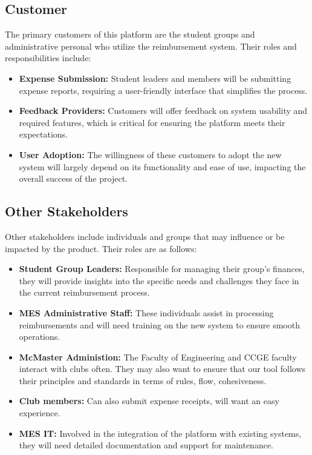 \documentclass[12pt]{article}
\begin{document}
\subsection{Customer}
The primary customers of this platform are the student groups and administrative personal who utilize the reimbursement system. Their roles and responsibilities include:
\begin{itemize}
    \item \textbf{Expense Submission:} Student leaders and members will be submitting expense reports, requiring a user-friendly interface that simplifies the process.
    \item \textbf{Feedback Providers:} Customers will offer feedback on system usability and required features, which is critical for ensuring the platform meets their expectations.
    \item \textbf{User Adoption:} The willingness of these customers to adopt the new system will largely depend on its functionality and ease of use, impacting the overall success of the project.
\end{itemize}

\subsection{Other Stakeholders}
Other stakeholders include individuals and groups that may influence or be impacted by the product. Their roles are as follows:
\begin{itemize}
    \item \textbf{Student Group Leaders:} Responsible for managing their group's finances, they will provide insights into the specific needs and challenges they face in the current reimbursement process.
    \item \textbf{MES Administrative Staff:} These individuals assist in processing reimbursements and will need training on the new system to ensure smooth operations.
    \item \textbf{McMaster Administion:} The Faculty of Engineering and CCGE faculty interact with clubs often. They may also want to ensure that our tool follows their principles and standards in terms of rules, flow, cohesiveness.
    \item \textbf{Club members:} Can also submit expense receipts, will want an easy experience.
    \item \textbf{MES IT:} Involved in the integration of the platform with existing systems, they will need detailed documentation and support for maintenance.
\end{itemize}
\end{document}
